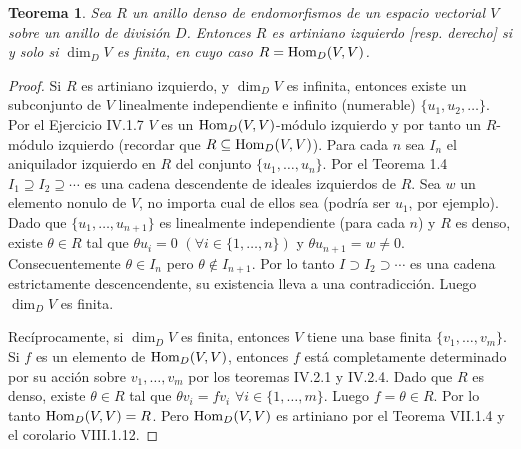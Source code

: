 \documentclass{report}
\newcommand{\Hom}{\textnormal{Hom}}
\newtheorem{theorem}{Teorema}
\begin{document}
  \begin{theorem}
    Sea \(R\) un anillo denso de endomorfismos de un espacio vectorial \(V\) sobre un anillo de división \(D\).
    Entonces \(R\) es artiniano izquierdo [resp. derecho] si y solo si \(\dim_D V\) es finita, en cuyo caso \(R = \Hom_D(V, V)\).
  \end{theorem}
  \begin{proof}
    Si \(R\) es artiniano izquierdo, y \(\dim_D V\) es infinita, entonces existe un subconjunto de \(V\) linealmente independiente e infinito (numerable) \(\{u_1, u_2, \dots\}\).
    Por el Ejercicio IV.1.7 \(V\) es un \(\Hom_D(V, V)\)-módulo izquierdo y por tanto un \(R\)-módulo izquierdo (recordar que \(R \subseteq \Hom_D(V, V)\)).
    Para cada \(n\) sea \(I_n\) el aniquilador izquierdo en \(R\) del conjunto \(\{u_1, \dots, u_n\}\).
    Por el Teorema 1.4 \(I_1 \supseteq I_2 \supseteq \cdots\) es una cadena descendente de ideales izquierdos de \(R\).
    Sea \(w\) un elemento nonulo de \(V\), no importa cual de ellos sea (podría ser \(u_1\), por ejemplo).
    Dado que \(\{u_1, \dots, u_{n + 1}\}\) es linealmente independiente (para cada \(n\)) y \(R\) es denso, existe \(\theta \in R\) tal que \(\theta u_i = 0\) \((\forall i \in \{1, \dots, n\})\) y \(\theta u_{n + 1} = w \neq 0\).
    Consecuentemente \(\theta \in I_n\) pero \(\theta \notin I_{n + 1}\).
    Por lo tanto \(I \supset I_2 \supset \cdots\) es una cadena estrictamente descencendente, su existencia lleva a una contradicción.
    Luego \(\dim_D V\) es finita.

    Recíprocamente, si \(\dim_D V\) es finita, entonces \(V\) tiene una base finita \(\{v_1, \dots, v_m\}\).
    Si \(f\) es un elemento de \(\Hom_D(V, V)\), entonces \(f\) está completamente determinado por su acción sobre \(v_1, \dots, v_m\) por los teoremas IV.2.1 y IV.2.4.
    Dado que \(R\) es denso, existe \(\theta \in R\) tal que \(\theta v_i = f v_i\) \(\forall i \in \{1, \dots, m\}\).
    Luego \(f = \theta \in R\).
    Por lo tanto \(\Hom_D(V, V) = R\).
    Pero \(\Hom_D(V, V)\) es artiniano por el Teorema VII.1.4 y el corolario VIII.1.12.
  \end{proof}
\end{document}
